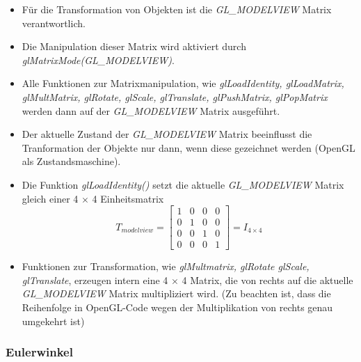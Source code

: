 \documentclass{scrartcl}
\begin{document}
\begin{itemize}
	\item Für die Transformation von Objekten ist die \textit{GL\_MODELVIEW} Matrix verantwortlich.
	\item Die Manipulation dieser Matrix wird aktiviert durch \textit{glMatrixMode(GL\_MODELVIEW)}.
	\item Alle Funktionen zur Matrixmanipulation, wie \textit{glLoadIdentity, glLoadMatrix, glMultMatrix, glRotate, glScale, glTranslate, glPushMatrix, glPopMatrix} werden dann auf der \textit{GL\_MODELVIEW} Matrix ausgeführt.
	\item Der aktuelle Zustand der \textit{GL\_MODELVIEW} Matrix beeinflusst die Tranformation der Objekte nur dann, wenn diese gezeichnet werden (OpenGL als Zustandsmaschine).
	\item Die Funktion \textit{glLoadIdentity()} setzt die aktuelle \textit{GL\_MODELVIEW} Matrix gleich einer 4 $\times$ 4 Einheitsmatrix
	\begin{equation}
		T_{modelview} = \begin{bmatrix}
	1 & 0 & 0 & 0 \\
	0 & 1 & 0 & 0 \\
	0 & 0 & 1 & 0 \\
	0 & 0 & 0 & 1
	\end{bmatrix} = I_{4 \times 4}
	\end{equation}
	\item Funktionen zur Transformation, wie \textit{glMultmatrix, glRotate glScale, glTranslate}, erzeugen intern eine 4 $\times$ 4 Matrix, die von rechts auf die aktuelle \textit{GL\_MODELVIEW} Matrix multipliziert wird. (Zu beachten ist, dass die Reihenfolge in OpenGL-Code wegen der Multiplikation von rechts genau umgekehrt ist)
\end{itemize}

\subsubsection{Eulerwinkel}
\end{document}
